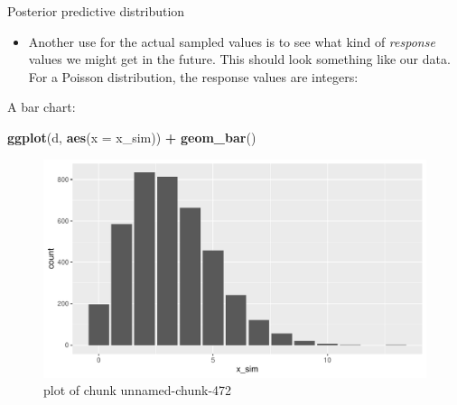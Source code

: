 \documentclass[
  ignorenonframetext,
]{beamer}
\newenvironment{Shaded}{\begin{snugshade}}{\end{snugshade}}
\newcommand{\DataTypeTok}[1]{\textcolor[rgb]{0.13,0.29,0.53}{#1}}
\newcommand{\DecValTok}[1]{\textcolor[rgb]{0.00,0.00,0.81}{#1}}
\newcommand{\KeywordTok}[1]{\textcolor[rgb]{0.13,0.29,0.53}{\textbf{#1}}}
\newcommand{\NormalTok}[1]{#1}
\newcommand{\OperatorTok}[1]{\textcolor[rgb]{0.81,0.36,0.00}{\textbf{#1}}}
\newcommand{\StringTok}[1]{\textcolor[rgb]{0.31,0.60,0.02}{#1}}
\providecommand{\tightlist}{%
  \setlength{\itemsep}{0pt}\setlength{\parskip}{0pt}}
\begin{document}
\begin{frame}[fragile]{Posterior predictive distribution}
\protect\hypertarget{posterior-predictive-distribution}{}

\begin{itemize}
\tightlist
\item
  Another use for the actual sampled values is to see what kind of
  \emph{response} values we might get in the future. This should look
  something like our data. For a Poisson distribution, the response
  values are integers:
\end{itemize}

\begin{Shaded}
\end{Shaded}

\end{frame}

\begin{frame}[fragile]{A bar chart:}
\protect\hypertarget{a-bar-chart}{}

\begin{Shaded}
\begin{Highlighting}[]
\KeywordTok{ggplot}\NormalTok{(d, }\KeywordTok{aes}\NormalTok{(}\DataTypeTok{x =}\NormalTok{ x_sim)) }\OperatorTok{+}\StringTok{ }\KeywordTok{geom_bar}\NormalTok{()}
\end{Highlighting}
\end{Shaded}

\begin{figure}
\centering
\includegraphics{figure/unnamed-chunk-472-1.pdf}
\caption{plot of chunk unnamed-chunk-472}
\end{figure}

\end{frame}
\end{document}
